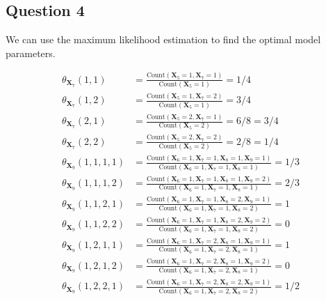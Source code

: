 \documentclass[11pt,fancychapters]{article}
\begin{document}
\subsection*{Question 4}

We can use the maximum likelihood estimation to find the optimal model parameters.

\begin{align*}
	\theta_{\mathbf{X}_7}(1, 1) &= \frac{\text{Count}(\mathbf{X}_5 = 1, \mathbf{X}_7 = 1)}{\text{Count}(\mathbf{X}_5 = 1)} = 1/4 \\
	\theta_{\mathbf{X}_7}(1, 2) &= \frac{\text{Count}(\mathbf{X}_5 = 1, \mathbf{X}_7 = 2)}{\text{Count}(\mathbf{X}_5 = 1)} = 3/4 \\
	\theta_{\mathbf{X}_7}(2, 1) &= \frac{\text{Count}(\mathbf{X}_5 = 2, \mathbf{X}_7 = 1)}{\text{Count}(\mathbf{X}_5 = 2)} = 6/8 = 3/4 \\
	\theta_{\mathbf{X}_7}(2, 2) &= \frac{\text{Count}(\mathbf{X}_5 = 2, \mathbf{X}_7 = 2)}{\text{Count}(\mathbf{X}_5 = 2)} = 2/8 = 1/4 \\
	\theta_{\mathbf{X}_9}(1, 1, 1, 1) &= \frac{\text{Count}(\mathbf{X}_6 = 1, \mathbf{X}_7 = 1, \mathbf{X}_8 = 1, \mathbf{X}_9 = 1)}{\text{Count}(\mathbf{X}_6 = 1, \mathbf{X}_7 = 1, \mathbf{X}_8 = 1)} = 1/3 \\
	\theta_{\mathbf{X}_9}(1, 1, 1, 2) &= \frac{\text{Count}(\mathbf{X}_6 = 1, \mathbf{X}_7 = 1, \mathbf{X}_8 = 1, \mathbf{X}_9 = 2)}{\text{Count}(\mathbf{X}_6 = 1, \mathbf{X}_7 = 1, \mathbf{X}_8 = 1)} = 2/3 \\
	\theta_{\mathbf{X}_9}(1, 1, 2, 1) &= \frac{\text{Count}(\mathbf{X}_6 = 1, \mathbf{X}_7 = 1, \mathbf{X}_8 = 2, \mathbf{X}_9 = 1)}{\text{Count}(\mathbf{X}_6 = 1, \mathbf{X}_7 = 1, \mathbf{X}_8 = 2)} = 1 \\
	\theta_{\mathbf{X}_9}(1, 1, 2, 2) &= \frac{\text{Count}(\mathbf{X}_6 = 1, \mathbf{X}_7 = 1, \mathbf{X}_8 = 2, \mathbf{X}_9 = 2)}{\text{Count}(\mathbf{X}_6 = 1, \mathbf{X}_7 = 1, \mathbf{X}_8 = 2)} = 0 \\
	\theta_{\mathbf{X}_9}(1, 2, 1, 1) &= \frac{\text{Count}(\mathbf{X}_6 = 1, \mathbf{X}_7 = 2, \mathbf{X}_8 = 1, \mathbf{X}_9 = 1)}{\text{Count}(\mathbf{X}_6 = 1, \mathbf{X}_7 = 2, \mathbf{X}_8 = 1)} = 1 \\
	\theta_{\mathbf{X}_9}(1, 2, 1, 2) &= \frac{\text{Count}(\mathbf{X}_6 = 1, \mathbf{X}_7 = 2, \mathbf{X}_8 = 1, \mathbf{X}_9 = 2)}{\text{Count}(\mathbf{X}_6 = 1, \mathbf{X}_7 = 2, \mathbf{X}_8 = 1)} = 0 \\
	\theta_{\mathbf{X}_9}(1, 2, 2, 1) &= \frac{\text{Count}(\mathbf{X}_6 = 1, \mathbf{X}_7 = 2, \mathbf{X}_8 = 2, \mathbf{X}_9 = 1)}{\text{Count}(\mathbf{X}_6 = 1, \mathbf{X}_7 = 2, \mathbf{X}_8 = 2)} = 1/2 \\

\end{align*}
\end{document}
